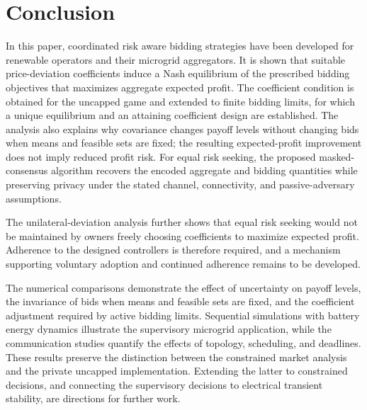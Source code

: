 \documentclass[journal]{IEEEtran}
\begin{document}
\section{Conclusion}

In this paper, coordinated risk aware bidding strategies have been developed for renewable operators and their microgrid aggregators. It is shown that suitable price-deviation coefficients induce a Nash equilibrium of the prescribed bidding objectives that maximizes aggregate expected profit. The coefficient condition is obtained for the uncapped game and extended to finite bidding limits, for which a unique equilibrium and an attaining coefficient design are established. The analysis also explains why covariance changes payoff levels without changing bids when means and feasible sets are fixed; the resulting expected-profit improvement does not imply reduced profit risk. For equal risk seeking, the proposed masked-consensus algorithm recovers the encoded aggregate and bidding quantities while preserving privacy under the stated channel, connectivity, and passive-adversary assumptions.

The unilateral-deviation analysis further shows that equal risk seeking would not be maintained by owners freely choosing coefficients to maximize expected profit. Adherence to the designed controllers is therefore required, and a mechanism supporting voluntary adoption and continued adherence remains to be developed.

The numerical comparisons demonstrate the effect of uncertainty on payoff levels, the invariance of bids when means and feasible sets are fixed, and the coefficient adjustment required by active bidding limits. Sequential simulations with battery energy dynamics illustrate the supervisory microgrid application, while the communication studies quantify the effects of topology, scheduling, and deadlines. These results preserve the distinction between the constrained market analysis and the private uncapped implementation. Extending the latter to constrained decisions, and connecting the supervisory decisions to electrical transient stability, are directions for further work.



\end{document}
